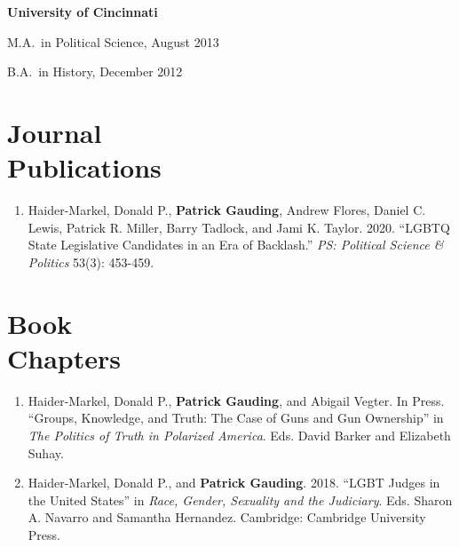 \documentclass[margin,line,pifont,palatino,courier]{res}
\newenvironment{list1}{
  \begin{list}{\ding{113}}{%
      \setlength{\itemsep}{0in}
      \setlength{\parsep}{0in} \setlength{\parskip}{0in}
      \setlength{\topsep}{0in} \setlength{\partopsep}{0in}
      \setlength{\leftmargin}{0.17in}}}{\end{list}}
\newenvironment{list2}{
  \begin{list}{$\bullet$}{%
      \setlength{\itemsep}{0in}
      \setlength{\parsep}{0in} \setlength{\parskip}{0in}
      \setlength{\topsep}{0in} \setlength{\partopsep}{0in}
      \setlength{\leftmargin}{0.2in}}}{\end{list}}
\begin{document}
\begin{resume}
{\bf University of Cincinnati}\\
\begin{list1}
\item[] M.A.~in Political Science, August 2013
\item[] B.A.~in History, December 2012


\end{list1}

\section{\sc Journal \\Publications}

\begin{enumerate}
  
\item Haider-Markel, Donald P., \textbf{Patrick Gauding}, Andrew Flores,
Daniel C. Lewis, Patrick R. Miller, Barry Tadlock, and Jami
K. Taylor. 2020. ``LGBTQ State Legislative Candidates in an Era
of Backlash.'' \emph{PS: Political Science \& Politics} 53(3): 453-459.


\end{enumerate}

\section{\sc Book \\Chapters}

\begin{enumerate}

\item Haider-Markel, Donald P., \textbf{Patrick Gauding}, and Abigail
  Vegter. In Press. ``Groups, Knowledge, and Truth: The Case of Guns and Gun
  Ownership'' in \textit{The Politics of Truth in Polarized
    America}. Eds. David Barker and Elizabeth Suhay.

\item Haider-Markel, Donald P., and \textbf{Patrick Gauding}. 2018. ``LGBT Judges
in the United States'' in \textit{Race, Gender, Sexuality and the
  Judiciary}. Eds. Sharon A. Navarro  and Samantha
Hernandez. Cambridge: Cambridge University Press.


\end{enumerate}
\end{resume}
\end{document}

